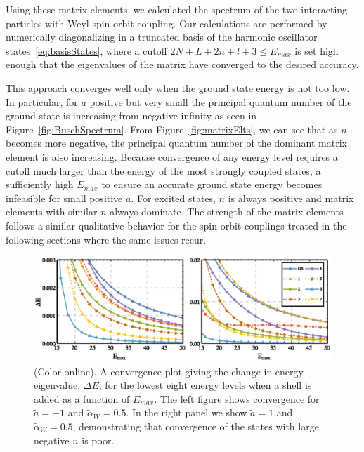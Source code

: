 \documentclass[%
 notitlepage,
 preprint,
showpacs,%
 amsmath,amssymb,
 aps,
pra,
]{revtex4-1}
\begin{document}
Using these matrix elements, we calculated the spectrum of the two interacting particles with Weyl spin-orbit coupling. Our calculations are performed by numerically diagonalizing in a truncated basis of the harmonic oscillator states~\eqref{eq:basisStates}, where a cutoff $2N+L+2n+l+3\leq E_{max}$ is set high enough that the eigenvalues of the matrix have converged to the desired accuracy.  

This approach converges well only when the ground state energy is not too low. In particular, for $a$ positive but very small the principal quantum number of the ground state is increasing from negative infinity as seen in Figure~\ref{fig:BuschSpectrum}. From Figure~\ref{fig:matrixElts}, we can see that as $n$ becomes more negative, the principal quantum number of the dominant matrix element is also increasing. Because convergence of any energy level requires a cutoff much larger than the energy of the most strongly coupled states, a sufficiently high $E_{max}$ to ensure an accurate ground state energy becomes infeasible for small positive $a$. For excited states, $n$ is always positive and matrix elements with similar $n$ always dominate. The strength of the matrix elements follows a similar qualitative behavior for the spin-orbit couplings treated in the following sections where the same issues recur. 

\begin{figure}
\includegraphics{Figures/WeylConvergence}
\caption{\label{fig:WeylConvergence}(Color online).  A convergence plot giving the change in energy eigenvalue, $\Delta E$, for the lowest eight energy levels when a shell is added as a function of $E_{max}$.  The left figure shows convergence for $\tilde{a}=-1$ and $\tilde{\alpha}_W=0.5$. In the right panel  we show $\tilde{a}=1$ and $\tilde{\alpha}_W=0.5$, demonstrating that convergence of the states with large negative $n$ is poor.} 
\end{figure}
\end{document}
